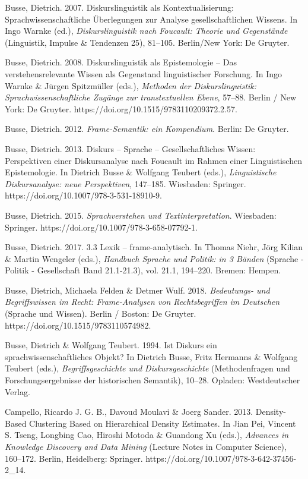 Busse, Dietrich. 2007. Diskurslinguistik als Kontextualisierung: Sprachwissenschaftliche Überlegungen zur Analyse gesellschaftlichen Wissens. In Ingo Warnke (ed.), \emph{Diskurslinguistik nach Foucault: Theorie und Gegenstände} (Linguistik, Impulse \& Tendenzen 25), 81--105. Berlin/New York: De Gruyter.

Busse, Dietrich. 2008. Diskurslinguistik als Epistemologie -- Das verstehensrelevante Wissen als Gegenstand linguistischer Forschung. In Ingo Warnke \& Jürgen Spitzmüller (eds.), \emph{Methoden der Diskurslinguistik: Sprachwissenschaftliche Zugänge zur transtextuellen Ebene}, 57--88. Berlin / New York: De Gruyter. https://doi.org/10.1515/9783110209372.2.57.

Busse, Dietrich. 2012. \emph{Frame-Semantik: ein Kompendium}. Berlin: De Gruyter.

Busse, Dietrich. 2013. Diskurs -- Sprache -- Gesellschaftliches Wissen: Perspektiven einer Diskursanalyse nach Foucault im Rahmen einer Linguistischen Epistemologie. In Dietrich Busse \& Wolfgang Teubert (eds.), \emph{Linguistische Diskursanalyse: neue Perspektiven}, 147--185. Wiesbaden: Springer. https://doi.org/10.1007/978-3-531-18910-9.

Busse, Dietrich. 2015. \emph{Sprachverstehen und Textinterpretation}. Wiesbaden: Springer. https://doi.org/10.1007/978-3-658-07792-1.

Busse, Dietrich. 2017. 3.3 Lexik -- frame-analytisch. In Thomas Niehr, Jörg Kilian \& Martin Wengeler (eds.), \emph{Handbuch Sprache und Politik: in 3 Bänden} (Sprache - Politik - Gesellschaft Band 21.1-21.3), vol. 21.1, 194--220. Bremen: Hempen.

Busse, Dietrich, Michaela Felden \& Detmer Wulf. 2018. \emph{Bedeutungs- und Begriffswissen im Recht: Frame-Analysen von Rechtsbegriffen im Deutschen} (Sprache und Wissen). Berlin / Boston: De Gruyter. https://doi.org/10.1515/9783110574982.

Busse, Dietrich \& Wolfgang Teubert. 1994. Ist Diskurs ein sprachwissenschaftliches Objekt? In Dietrich Busse, Fritz Hermanns \& Wolfgang Teubert (eds.), \emph{Begriffsgeschichte und Diskursgeschichte} (Methodenfragen und Forschungsergebnisse der historischen Semantik), 10--28. Opladen: Westdeutscher Verlag.

Campello, Ricardo J. G. B., Davoud Moulavi \& Joerg Sander. 2013. Density-Based Clustering Based on Hierarchical Density Estimates. In Jian Pei, Vincent S. Tseng, Longbing Cao, Hiroshi Motoda \& Guandong Xu (eds.), \emph{Advances in Knowledge Discovery and Data Mining} (Lecture Notes in Computer Science), 160--172. Berlin, Heidelberg: Springer. https://doi.org/10.1007/978-3-642-37456-2\_14.

